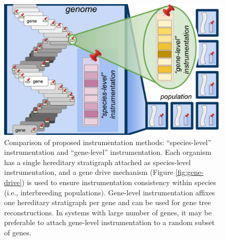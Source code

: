 \begin{figure}
  \centering
  \includegraphics[width=\textwidth]{img/annotation-types}
  \caption{
    Comparison of proposed instrumentation methods: ``species-level'' instrumentation and ``gene-level'' instrumentation.
    Each organism has a single hereditary stratigraph attached as species-level instrumentation, and a gene drive mechanism (Figure \ref{fig:gene-drive}) is used to ensure instrumentation consistency within species (i.e., interbreeding populations).
    Gene-level instrumentation affixes one hereditary stratigraph per gene and can be used for gene tree reconstructions.
    In systems with large number of genes, it may be preferable to attach gene-level instrumentation to a random subset of genes.
  }
  \label{fig:annotation-types}
\end{figure}
